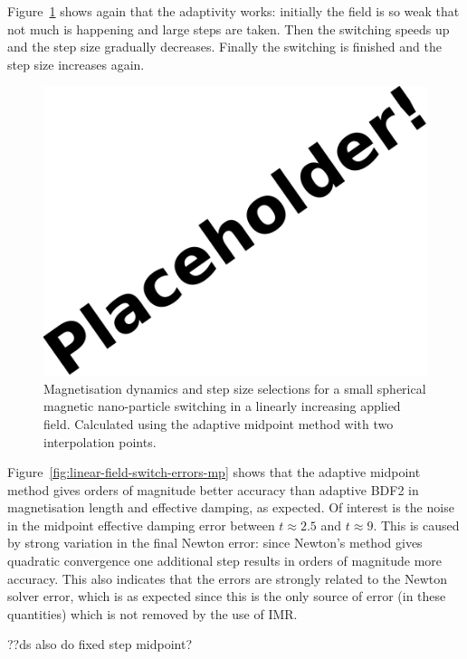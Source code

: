 Figure~\ref{fig:linear-field-switch-mp} shows again that the adaptivity works: initially the field is so weak that not much is happening and large steps are taken.
Then the switching speeds up and the step size gradually decreases.
Finally the switching is finished and the step size increases again.

\begin{figure}[ht!]
  \centering
  \includegraphics{images/placeholder}
  \caption{Magnetisation dynamics and step size selections for a small spherical magnetic nano-particle switching in a linearly increasing applied field. Calculated using the adaptive midpoint method with two interpolation points.}
  \label{fig:linear-field-switch-mp}
\end{figure}

Figure~\ref{fig:linear-field-switch-errors-mp} shows that the adaptive midpoint method gives orders of magnitude better accuracy than adaptive BDF2 in magnetisation length and effective damping, as expected.
Of interest is the noise in the midpoint effective damping error between $t \approx 2.5$ and $t \approx 9$.
This is caused by strong variation in the final Newton error: since Newton's method gives quadratic convergence one additional step results in orders of magnitude more accuracy.
This also indicates that the errors are strongly related to the Newton solver error, which is as expected since this is the only source of error (in these quantities) which is not removed by the use of IMR.

??ds also do fixed step midpoint?

